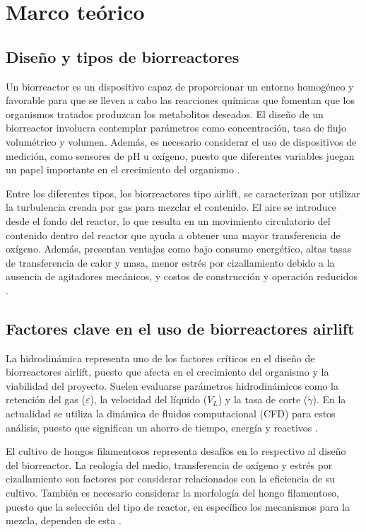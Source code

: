 \chapter{Marco teórico}\label{cap4}

\section{Diseño y tipos de biorreactores}

Un biorreactor es un dispositivo capaz de proporcionar un entorno homogéneo y
favorable para que se lleven a cabo las reacciones químicas que fomentan que los
organismos tratados produzcan los metabolitos deseados. El diseño de un
biorreactor involucra contemplar parámetros como concentración, tasa de flujo
volumétrico y volumen. Además, es necesario considerar el uso de dispositivos de
medición, como sensores de pH u oxígeno, puesto que diferentes variables juegan
un papel importante en el crecimiento del organismo \cite{Jaibiba2020}.

Entre los diferentes tipos, los biorreactores tipo airlift, se caracterizan por utilizar la
turbulencia creada por gas para mezclar el contenido. El aire se introduce desde el
fondo del reactor, lo que resulta en un movimiento circulatorio del contenido dentro
del reactor que ayuda a obtener una mayor transferencia de oxígeno.
Además, presentan ventajas como bajo consumo energético, altas tasas de
transferencia de calor y masa, menor estrés por cizallamiento debido a la ausencia
de agitadores mecánicos, y costos de construcción y operación reducidos \cite{Esperanca2023}.

\section{Factores clave en el uso de biorreactores airlift}

La hidrodinámica representa uno de los factores críticos en el diseño de
biorreactores airlift, puesto que afecta en el crecimiento del organismo y la viabilidad
del proyecto. Suelen evaluarse parámetros hidrodinámicos como la retención del
gas ($\varepsilon$), la velocidad del líquido ($V_L$) y la tasa de corte ($\dot{\gamma}$). En la actualidad se utiliza
la dinámica de fluidos computacional (CFD) para estos análisis, puesto que
significan un ahorro de tiempo, energía y reactivos \cite{Esperanca2023}.

El cultivo de hongos filamentosos representa desafíos en lo respectivo al diseño del
biorreactor. La reología del medio, transferencia de oxígeno y estrés por
cizallamiento son factores por considerar relacionados con la eficiencia de su
cultivo. También es necesario considerar la morfología del hongo filamentoso,
puesto que la selección del tipo de reactor, en específico los mecanismos para la
mezcla, dependen de esta \cite{Gomes2023}.

